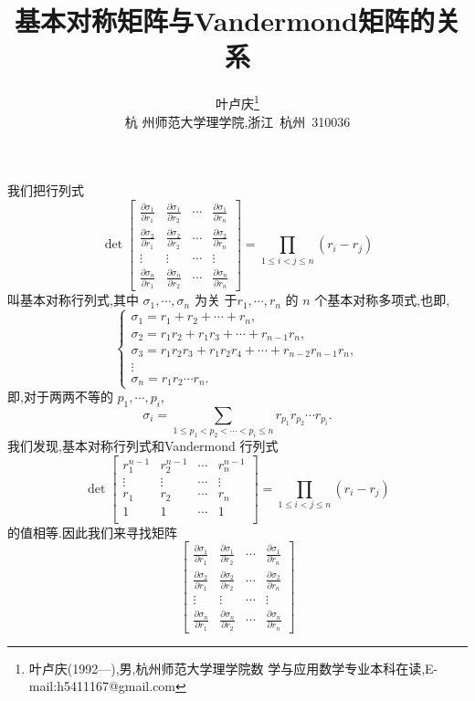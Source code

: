 \documentclass[a4paper]{article}
\newcommand{\pa}{\partial} \newcommand{\Om}{\Omega}
\begin{document}
\title{\huge{\bf{基本对称矩阵与Vandermond矩阵的关系}}}
\author{\small{叶卢庆\footnote{叶卢庆(1992---),男,杭州师范大学理学院数
      学与应用数学专业本科在读,E-mail:h5411167@gmail.com}}\\{\small{杭
      州师范大学理学院,浙江~杭州~310036}}}
\maketitle
\noindent 我们把行列式
\begin{equation}
  \label{eq:1}
\det  \begin{bmatrix}
    \frac{\pa \sigma_1}{\pa r_1}&\frac{\pa \sigma_1}{\pa
      r_2}&\cdots&\frac{\pa\sigma_1}{\pa r_n}\\
    \frac{\pa \sigma_2}{\pa r_1}&\frac{\pa \sigma_2}{\pa
      r_2}&\cdots&\frac{\pa\sigma_2}{\pa r_n}\\
    \vdots&\vdots&\cdots&\vdots\\
    \frac{\pa \sigma_n}{\pa r_1}&\frac{\pa \sigma_n}{\pa
      r_2}&\cdots&\frac{\pa\sigma_n}{\pa r_n}
  \end{bmatrix}=\prod_{1\leq i<j\leq n} (r_i-r_j)
\end{equation}
叫基本对称行列式,其中 $\sigma_1,\cdots,\sigma_n$ 为关
于$r_1,\cdots,r_n$ 的 $n$ 个基本对称多项式,也即,$$
  \begin{cases}
    \sigma_1=r_1+r_2+\cdots+r_n,\\
\sigma_2=r_1r_2+r_1r_3+\cdots+r_{n-1}r_n,\\
\sigma_3=r_1r_2r_3+r_1r_2r_4+\cdots+r_{n-2}r_{n-1}r_n,\\
\vdots\\
\sigma_n=r_1r_2\cdots r_n.
  \end{cases}
$$
即,对于两两不等的 $p_1,\cdots,p_i$,
$$
\sigma_i=\sum_{1\leq p_1<p_2<\cdots<p_i\leq n}r_{p_1}r_{p_2}\cdots r_{p_i}.
$$
我们发现,基本对称行列式和Vandermond 行列式
\begin{equation}
  \label{eq:2}
\det\begin{bmatrix}
r_1^{n-1}&r_2^{n-1}&\cdots&r_n^{n-1}\\
\vdots&\vdots&\cdots&\vdots\\
r_1&r_2&\cdots&r_n\\
  1&1&\cdots&1\\
\end{bmatrix}=\prod_{1\leq i<j\leq n} (r_i-r_j)
\end{equation}
的值相等.因此我们来寻找矩阵
\begin{equation}
  \label{eq:3}
   \begin{bmatrix}
    \frac{\pa \sigma_1}{\pa r_1}&\frac{\pa \sigma_1}{\pa
      r_2}&\cdots&\frac{\pa\sigma_1}{\pa r_n}\\
    \frac{\pa \sigma_2}{\pa r_1}&\frac{\pa \sigma_2}{\pa
      r_2}&\cdots&\frac{\pa\sigma_2}{\pa r_n}\\
    \vdots&\vdots&\cdots&\vdots\\
    \frac{\pa \sigma_n}{\pa r_1}&\frac{\pa \sigma_n}{\pa
      r_2}&\cdots&\frac{\pa\sigma_n}{\pa r_n}
  \end{bmatrix}
\end{equation}
\end{document}

